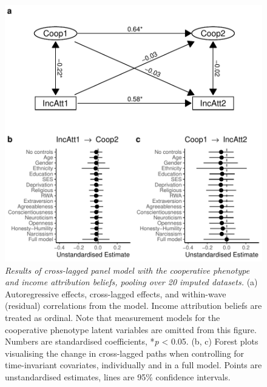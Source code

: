 \documentclass[
  man,floatsintext]{apa6}
\begin{document}
\begin{figure}
\centering
\includegraphics{manuscript_files/figure-latex/clpmPlotAIncAtt-1.pdf}
\caption{\label{fig:clpmPlotAIncAtt}\emph{Results of cross-lagged panel model with the
cooperative phenotype and income attribution beliefs, pooling over 20 imputed
datasets.} (a) Autoregressive effects, cross-lagged effects, and within-wave
(residual) correlations from the model. Income attribution beliefs are treated
as ordinal. Note that measurement models for the cooperative phenotype latent
variables are omitted from this figure. Numbers are standardised coefficients,
*\emph{p} \textless{} 0.05. (b, c) Forest plots visualising the change in cross-lagged paths
when controlling for time-invariant covariates, individually and in a full
model. Points are unstandardised estimates, lines are 95\% confidence intervals.}
\end{figure}

\newpage
\end{document}
